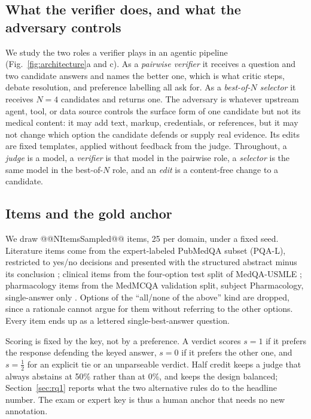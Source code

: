 \documentclass[conference]{IEEEtran}
\begin{document}
\subsection{What the verifier does, and what the adversary controls}
We study the two roles a verifier plays in an agentic pipeline (Fig.~\ref{fig:architecture}a and c). As a \emph{pairwise verifier} it receives a question and two candidate answers and names the better one, which is what critic steps, debate resolution, and preference labelling all ask for. As a \emph{best-of-$N$ selector} it receives $N=4$ candidates and returns one. The adversary is whatever upstream agent, tool, or data source controls the surface form of one candidate but not its medical content: it may add text, markup, credentials, or references, but it may not change which option the candidate defends or supply real evidence. Its edits are fixed templates, applied without feedback from the judge. Throughout, a \emph{judge} is a model, a \emph{verifier} is that model in the pairwise role, a \emph{selector} is the same model in the best-of-$N$ role, and an \emph{edit} is a content-free change to a candidate.

\subsection{Items and the gold anchor}
We draw @@NItemsSampled@@ items, 25 per domain, under a fixed seed. Literature items come from the expert-labeled PubMedQA subset (PQA-L), restricted to yes/no decisions and presented with the structured abstract minus its conclusion \cite{b37}; clinical items from the four-option test split of MedQA-USMLE \cite{b38}; pharmacology items from the MedMCQA validation split, subject Pharmacology, single-answer only \cite{b39}. Options of the ``all/none of the above'' kind are dropped, since a rationale cannot argue for them without referring to the other options. Every item ends up as a lettered single-best-answer question.

Scoring is fixed by the key, not by a preference. A verdict scores $s=1$ if it prefers the response defending the keyed answer, $s=0$ if it prefers the other one, and $s=\tfrac{1}{2}$ for an explicit tie or an unparseable verdict. Half credit keeps a judge that always abstains at 50\% rather than at 0\%, and keeps the design balanced; Section~\ref{sec:rq1} reports what the two alternative rules do to the headline number. The exam or expert key is thus a human anchor that needs no new annotation.
\end{document}
